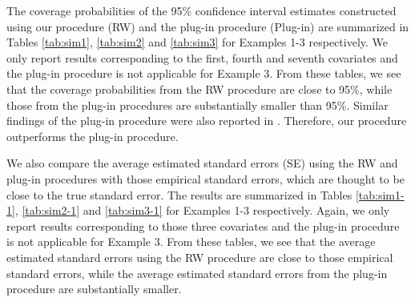 \documentclass[12pt]{article}
\begin{document}
The coverage probabilities of the 95\% confidence interval estimates constructed using our procedure (RW) and the plug-in procedure (Plug-in) are summarized in Tables \ref{tab:sim1},  \ref{tab:sim2} and \ref{tab:sim3} for Examples 1-3 respectively. We only report results corresponding to the first, fourth and seventh covariates and the plug-in procedure is not applicable for Example 3. From these tables, we see that the coverage probabilities from the RW procedure are close to 95\%, while those from the plug-in procedures are substantially smaller than 95\%. Similar findings of the plug-in procedure were also reported in \cite{chen2016statistical}. Therefore, our procedure outperforms the plug-in procedure.

We also compare the average estimated standard errors (SE) using the RW and plug-in procedures with those empirical standard errors, which are thought to be close to the true standard error. The results are summarized in Tables  \ref{tab:sim1-1},  \ref{tab:sim2-1} and \ref{tab:sim3-1} for Examples 1-3 respectively. Again, we only report results corresponding to those three covariates and the plug-in procedure is not applicable for Example 3. From these tables, we see that the average estimated standard errors using the RW procedure are close to those empirical standard errors, while the average estimated standard errors from the plug-in procedure are substantially smaller.


%

\end{document}
